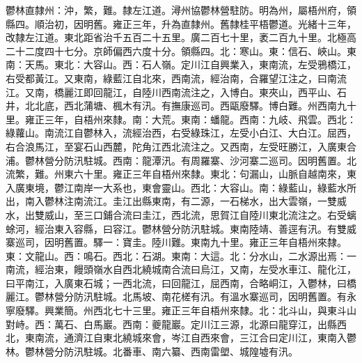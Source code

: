 \begin{pinyinscope}
鬱林直隸州：沖，繁，難。隸左江道。潯州協鬱林營駐防。明為州，屬梧州府，領縣四。順治初，因明舊。雍正三年，升為直隸州。舊隸桂平梧鬱道。光緒十三年，改隸左江道。東北距省治千五百二十五里。廣二百七十里，袤二百九十里。北極高二十二度四十七分。京師偏西六度十分。領縣四。北：寒山。東：信石、峽山。東南：天馬。東北：大容山。西：石人嶺。定川江自興業入，東南流，左受鴉橋江，右受都黃江。又東南，綠藍江自北來，西南流，經治南，合羅望江注之，曰南流江。又南，橋麗江即回龍江，自陸川西南流注之，入博白。東夾山，西平山、石井，北北底，西北蒲塘、楓木有汛。有撫康巡司。西甌廢驛。博白難。州西南九十里。雍正三年，自梧州來隸。南：大荒。東南：蟠龍。西南：九岐、飛雲。西北：綠蘿山。南流江自鬱林入，流經治西，右受綠珠江，左受小白江、大白江。屈西，右合浪馬江，至宴石山西麓，陀角江西北流注之。又西南，左受旺勝江，入廣東合浦。鬱林營分防汛駐城。西南：龍潭汛。有周羅寨、沙河寨二巡司。因明舊置。北流繁，難。州東六十里。雍正三年自梧州來隸。東北：句漏山，山脈自越南來，東入廣東境，鬱江南岸一大系也，東會靈山。西北：大容山。南：綠藍山，綠藍水所出，南入鬱林注南流江。圭江出縣東南，有二源，一石梯水，出大雲嶺，一雙威水，出雙威山，至三口鋪合流曰圭江，西北流，思賀江自陸川東北流注之。右受螭蜍河，經治東入容縣，曰容江。鬱林營分防汛駐城。東南陸靖、善逕有汛。有雙威寨巡司，因明舊置。驛一：寶圭。陸川難。東南九十里。雍正三年自梧州來隸。東：文龍山。西：鳴石。西北：石湖。東南：大這。北：分水山，二水源出焉：一南流，經治東，饅頭嶺水自西北繞城南合流曰烏江，又南，左受水車江、龍化江，曰平南江，入廣東石城；一西北流，曰回龍江，屈西南，合略峒江，入鬱林，曰橋麗江。鬱林營分防汛駐城。北馬坡、南花槎有汛。有溫水寨巡司，因明舊置。有永寧廢驛。興業簡。州西北七十三里。雍正三年自梧州來隸。北：北斗山，與東斗山對峙。西：萬石、白馬巖。西南：夔龍巖。定川江三源，北源曰龍穿江，出縣西北，東南流，通濟江自東北繞城來會，岑江自西來會，三江合曰定川江，東南入鬱林。鬱林營分防汛駐城。北番車、南六纂、西南雷塱、城隍墟有汛。


\end{pinyinscope}
